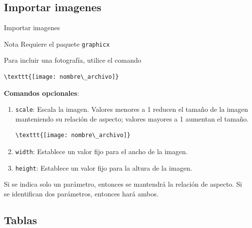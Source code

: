 \documentclass[../slides.tex]{subfiles}
\begin{document}
    
    \begin{frame}
        \tableofcontents[sections=\value{section}]
    \end{frame}

    \subsection{Importar imagenes}
    \begin{frame}[fragile]{Importar imagenes}
        \begin{block}{Nota}
            Requiere el paquete \texttt{graphicx}
        \end{block}

        Para incluir una fotografía, utilice el comando 
        \begin{verbatim}
\texttt{[image: nombre\_archivo]}
        \end{verbatim}
        \textbf{Comandos opcionales}:
            \begin{enumerate}
                \item \texttt{scale}: Escala la imagen. Valores menores a 1 reducen el tamaño de la imagen manteniendo su relación de aspecto; valores mayores a 1 aumentan el tamaño.
        \begin{verbatim}
\texttt{[image: nombre\_archivo]}
        \end{verbatim}
                \item \texttt{width}: Establece un valor fijo para el ancho de la imagen.
                \item \texttt{height}: Establece un valor fijo para la altura de la imagen.
            \end{enumerate}
        Si se indica solo un parámetro, entonces se mantendrá la relación de aspecto. Si se identifican dos parámetros, entonces hará ambos.
    \end{frame}

    \subsection{Tablas}
\end{document}
